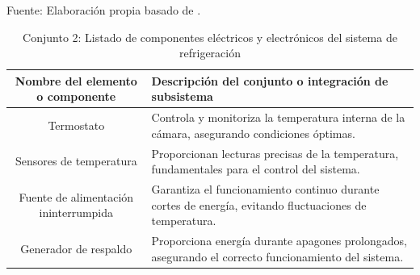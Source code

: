 \begin{table}[H]
	\centering
	\caption{Conjunto 2: Listado de componentes eléctricos y electrónicos del sistema de refrigeración}
	Fuente: Elaboración propia basado de .
	\begin{tabular}{@{}cl@{}}
		\toprule
		\begin{minipage}[t]{0.25\linewidth}\textbf{Nombre del elemento o componente}\end{minipage} & \begin{minipage}[t]{0.50\linewidth}\textbf{Descripción del conjunto o integración de subsistema}\end{minipage} \\
		
		\midrule
		Termostato                                & \begin{minipage}[t]{0.5\linewidth}Controla y monitoriza la temperatura interna de la cámara, asegurando condiciones óptimas.\end{minipage} \\
		Sensores de temperatura                   & \begin{minipage}[t]{0.5\linewidth}Proporcionan lecturas precisas de la temperatura, fundamentales para el control del sistema.\end{minipage} \\
		Fuente de alimentación ininterrumpida & \begin{minipage}[t]{0.5\linewidth}Garantiza el funcionamiento continuo durante cortes de energía, evitando fluctuaciones de temperatura.\end{minipage} \\
		Generador de respaldo                     & \begin{minipage}[t]{0.5\linewidth}Proporciona energía durante apagones prolongados, asegurando el correcto funcionamiento del sistema.\end{minipage} \\ \bottomrule
	\end{tabular}
	\label{tabla:electricos}
\end{table}

